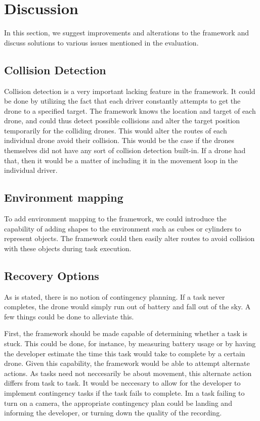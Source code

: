 \section{Discussion}
In this section, we suggest improvements and alterations to the framework and discuss solutions to various issues mentioned in the evaluation.

\subsection{Collision Detection}
Collision detection is a very important lacking feature in the framework. It could be done by utilizing the fact that each driver constantly attempts to get the drone to a specified target. The framework knows the location and target of each drone, and could thus detect possible collisions and alter the target position temporarily for the colliding drones. This would alter the routes of each individual drone avoid their collision. This would be the case if the drones themselves did not have any sort of collision detection built-in. If a drone had that, then it would be a matter of including it in the movement loop in the individual driver.

\subsection{Environment mapping}
To add environment mapping to the framework, we could introduce the capability of adding shapes to the environment such as cubes or cylinders to represent objects. The framework could then easily alter routes to avoid collision with these objects during task execution.

\subsection{Recovery Options}
As is stated, there is no notion of contingency planning. If a task never completes, the drone would simply run out of battery and fall out of the sky. A few things could be done to alleviate this.

First, the framework should be made capable of determining whether a task is stuck. This could be done, for instance, by measuring battery usage or by having the developer estimate the time this task would take to complete by a certain drone. Given this capability, the framework would be able to attempt alternate actions. As tasks need not neccesarily be about movement, this alternate action differs from task to task. It would be neccesary to allow for the developer to implement contingency tasks if the task fails to complete. Im a task failing to turn on a camera, the appropriate contingency plan could be landing and informing the developer, or turning down the quality of the recording.

